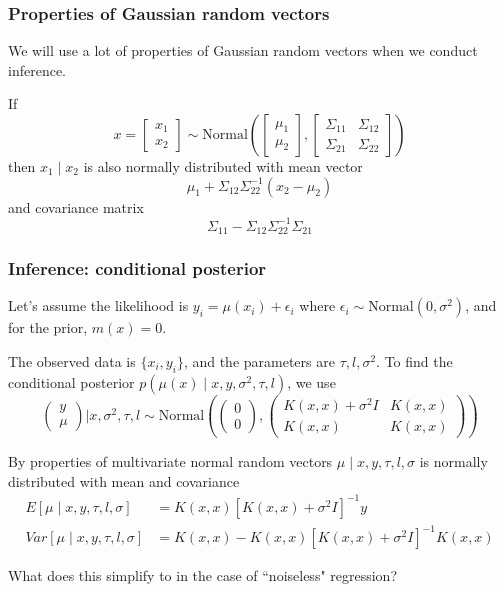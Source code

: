 \documentclass{beamer}
\begin{document}
\begin{frame}
\frametitle{Properties of Gaussian random vectors}

We will use a lot of properties of Gaussian random vectors when we conduct inference.
\newline

If 
$$
x = 
\left[\begin{array}{c}
x_1 \\
x_2
\end{array}\right]
\sim
\text{Normal}\left( 
\left[\begin{array}{c}
\mu_1 \\
\mu_2
\end{array}\right],
\left[\begin{array}{cc}
\Sigma_{11} & \Sigma_{12} \\
\Sigma_{21} & \Sigma_{22} 
\end{array}\right]
\right)
$$
then $x_1 \mid x_2$ is also normally distributed with mean vector
$$
\mu_1 + \Sigma_{12}\Sigma_{22}^{-1}(x_2 - \mu_2)
$$
and covariance matrix
$$
\Sigma_{11} - \Sigma_{12}\Sigma_{22}^{-1}\Sigma_{21}
$$


\end{frame}

\begin{frame}
\frametitle{Inference: conditional posterior}


Let's assume the likelihood is $y_i = \mu(x_i) + \epsilon_i$ where $\epsilon_i \sim \text{Normal}(0,\sigma^2)$, and for the prior, $m(x) = 0$. 
\newline

The observed data is $\{x_i,y_i\}$, and the parameters are $\tau, l, \sigma^2$. To find the conditional posterior $p(\mu(x) \mid x,y,\sigma^2, \tau, l)$, we use
$$
\left(\begin{array}{c}
y \\
\mu
\end{array}\right) 
\bigg\rvert x, \sigma^2, \tau, l
\sim \text{Normal}\left(
\left(\begin{array}{c}
0\\
0
\end{array}\right),
\left(\begin{array}{cc}
K(x,x) + \sigma^2 I & K(x,x)\\
K(x,x) & K(x,x)
\end{array}\right)
\right)
$$
\pause

By properties of multivariate normal random vectors $\mu \mid x, y, \tau, l, \sigma$ is normally distributed with mean and covariance
\begin{align*}
E[\mu \mid x, y, \tau, l, \sigma] &= K(x, x) [K(x,x) + \sigma^2 I]^{-1} y \\
Var[\mu \mid x, y, \tau, l, \sigma] &= K(x, x) - K(x, x)[K(x,x) + \sigma^2 I]^{-1} K(x,x)
\end{align*}
\pause

What does this simplify to in the case of ``noiseless" regression?

\end{frame}
\end{document}
